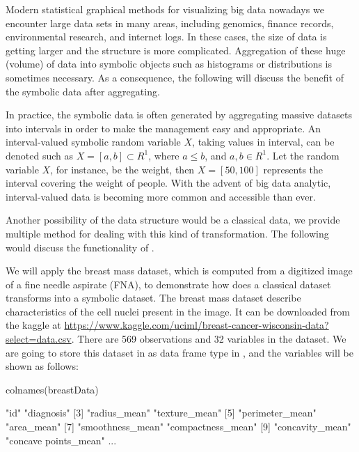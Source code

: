 \documentclass[article]{jss}
\begin{document}
Modern statistical graphical methods for visualizing big data nowadays
we encounter large data sets in many areas, including genomics,
finance records, environmental research, and internet logs. In these
cases, the size of data is getting larger and the structure is more
complicated. Aggregation of these huge (volume) of data into symbolic
objects such as histograms or distributions is sometimes necessary. As
a consequence, the following will discuss the benefit of the symbolic
data after aggregating.

In practice, the symbolic data is often generated by aggregating
massive datasets into intervals in order to make the management easy
and appropriate. An interval-valued symbolic random variable $X$,
taking values in interval, can be denoted such as $X = [a,b] \subset 
R^{1}$, where $a \leq b$, and $a, b \in R^{1}$. Let the random
variable $X$, for instance, be the weight, then $X = [50,100]$
represents the interval covering the weight of people. With the advent
of big data analytic, interval-valued data is becoming more common and
accessible than ever. 


Another possibility of the data structure would be a classical data, we provide multiple method for dealing with this kind of transformation. The following would discuss the functionality of .

We will apply the breast mass dataset, which is computed from a digitized image of a fine needle aspirate (FNA), to demonstrate how does a classical dataset transforms into a symbolic dataset. The breast mass dataset describe characteristics of the cell nuclei present in the image. It can be downloaded from the kaggle at \url{https://www.kaggle.com/uciml/breast-cancer-wisconsin-data?select=data.csv}. There are 569 observations and 32 variables in the dataset. We are going to store this dataset in  as data frame type in , and the variables will be shown as follows:

\begin{CodeChunk}
\begin{CodeInput}
colnames(breastData)
\end{CodeInput}
\begin{CodeOutput}
[1] "id"               "diagnosis"
[3] "radius_mean"      "texture_mean"
[5] "perimeter_mean"   "area_mean"
[7] "smoothness_mean"  "compactness_mean"
[9] "concavity_mean"   "concave points_mean"
...
\end{CodeOutput}
\end{CodeChunk}
\end{document}
